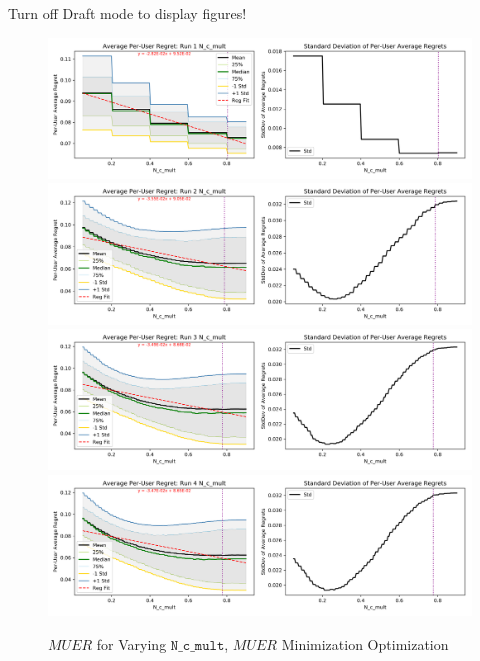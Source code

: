 	\ifdraft
	Turn off Draft mode to display figures!
	\else
	\begin{figure}[H]
	\includegraphics[width=1.1\textwidth,center]{figures/opt_param/opt_param_11100_N_c_mult1.png}%
	\newline
	\includegraphics[width=1.1\textwidth,center]{figures/opt_param/opt_param_11100_N_c_mult2.png}%
	\newline
	\includegraphics[width=1.1\textwidth,center]{figures/opt_param/opt_param_11100_N_c_mult3.png}%
	\newline
	\includegraphics[width=1.1\textwidth,center]{figures/opt_param/opt_param_11100_N_c_mult4.png}%
	\caption{$MUER$ for Varying $\mathtt{N\_c\_mult}$, $MUER$ Minimization Optimization}
	\end{figure}

